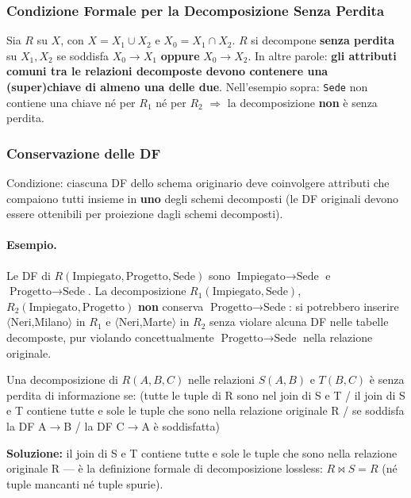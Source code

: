 \documentclass[12pt, a4paper]{article}
\begin{document}
\subsubsection{Condizione Formale per la Decomposizione Senza Perdita}
Sia $R$ su $X$, con $X = X_1 \cup X_2$ e $X_0 = X_1 \cap X_2$. $R$ si decompone \textbf{senza perdita} su $X_1, X_2$ se soddisfa $X_0 \to X_1$ \textbf{oppure} $X_0 \to X_2$. In altre parole: \textbf{gli attributi comuni tra le relazioni decomposte devono contenere una (super)chiave di almeno una delle due}. Nell'esempio sopra: \texttt{Sede} non contiene una chiave né per $R_1$ né per $R_2$ $\Rightarrow$ la decomposizione \textbf{non} è senza perdita.

\subsubsection{Conservazione delle DF}
Condizione: ciascuna DF dello schema originario deve coinvolgere attributi che compaiono tutti insieme in \textbf{uno} degli schemi decomposti (le DF originali devono essere ottenibili per proiezione dagli schemi decomposti).

\paragraph{Esempio.} Le DF di $R(\text{Impiegato},\text{Progetto},\text{Sede})$ sono $\text{Impiegato}\to\text{Sede}$ e $\text{Progetto}\to\text{Sede}$. La decomposizione $R_1(\text{Impiegato},\text{Sede})$, $R_2(\text{Impiegato},\text{Progetto})$ \textbf{non} conserva $\text{Progetto}\to\text{Sede}$: si potrebbero inserire $\langle$Neri,Milano$\rangle$ in $R_1$ e $\langle$Neri,Marte$\rangle$ in $R_2$ senza violare alcuna DF nelle tabelle decomposte, pur violando concettualmente $\text{Progetto}\to\text{Sede}$ nella relazione originale.

\begin{tcolorbox}[colback=lightergray!10, colframe=tocsec, title=\textbf{Esercizio 1}]
Una decomposizione di $R(A,B,C)$ nelle relazioni $S(A,B)$ e $T(B,C)$ è senza perdita di informazione se: (tutte le tuple di R sono nel join di S e T / il join di S e T contiene tutte e sole le tuple che sono nella relazione originale R / se soddisfa la DF A$\to$B / la DF C$\to$A è soddisfatta)
\end{tcolorbox}
\textbf{Soluzione:} il join di S e T contiene tutte e sole le tuple che sono nella relazione originale R — è la definizione formale di decomposizione lossless: $R \bowtie S = R$ (né tuple mancanti né tuple spurie).
\end{document}
